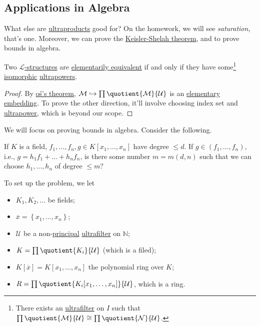 \subsection{Applications in Algebra}
What else are \hyperref[def:ultraproduct]{ultraproducts} good for? On the homework, we will see \emph{saturation}, that's one. Moreover, we can prove the \hyperref[thm:Keisler-Shelah]{Keisler-Shelah theorem}, and to prove bounds in algebra.

\begin{theorem}\label{thm:Keisler-Shelah}
	Two \hyperref[def:structure]{\(\mathcal{L} \)-structures} are \hyperref[def:elementarily-equivalent]{elementarily equivalent} if and only if they have some\footnote{There exists an \hyperref[def:ultrafilter]{ultrafilter} on \(I\) such that \(\prod \quotient{\mathcal{M} }{\mathcal{U} } \cong \prod \quotient{\mathcal{N} }{\mathcal{U} } \).} \hyperref[def:isomorphism]{isomorphic} \hyperref[def:ultrapower]{ultrapowers}.
\end{theorem}
\begin{proof}
	By \hyperref[thm:Los]{oś's theorem}, \(\mathcal{M} \hookrightarrow \prod \quotient{\mathcal{M} }{\mathcal{U} } \) is an \hyperref[def:elementary-embedding]{elementary embedding}. To prove the other direction, it'll involve choosing index set and \hyperref[def:ultrapower]{ultrapower}, which is beyond our scope.
\end{proof}

We will focus on proving bounds in algebra. Consider the following.

\begin{problem}
If \(K\) is a field, \(f_1, \dots , f_n, g\in K[x_1, \dots , x_n]\) have degree \(\leq d\). If \(g \in (f_1, \dots , f_n)\), i.e., \(g = h_1 f_1 + \dots + h_n f_n\), is there some number \(m = m(d, n)\) such that we can choose \(h_1, \dots , h_n\) of degree \(\leq m\)?
\end{problem}

To set up the problem, we let
\begin{itemize}
	\item \(K_1, K_2, \dots \) be fields;
	\item \(\overline{x} = \left\{ x_1, \dots , x_n \right\} \);
	\item \(\mathcal{U} \) be a non-\hyperref[eg:principal-filter]{principal} \hyperref[def:ultrafilter]{ultrafilter} on \(\mathbb{N} \);
	\item \(K = \prod \quotient{K_i}{\mathcal{U} } \) (which is a filed);
	\item \(K[\overline{x} ] = K[x_1, \dots , x_n]\) the polynomial ring over \(K\);
	\item \(R = \prod \quotient{K_i[x_1, \dots , x_n]}{\mathcal{U} } \), which is a ring.
\end{itemize}

